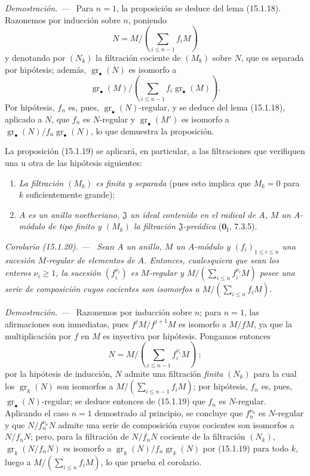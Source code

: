 \documentclass[10pt,oneside]{book}
\makeatletter
\newcommand{\gr}{\operatorname{gr}}
\newcommand{\setmanualcurrentlabel}[1]{\def\@currentlabel{#1}}
\newcommand{\oldpage}[2][]{%
  \setcounter{footnote}{0}%
  \marginpar{\scriptsize\textbf{#1}~|~#2}\ignorespaces}
\newenvironment{corollary}[1][]{%
  \setmanualcurrentlabel{#1}\par\medskip\noindent\itshape Corolario (#1). ---\ }{\par}
\newenvironment{proof}{%
  \par\medskip\noindent\textit{Demostración. ---\ }}{\par}
\makeatother
\begin{document}
\begin{proof}
Para $n=1$, la proposición se deduce del lema (15.1.18). Razonemos por
inducción sobre $n$, poniendo
\[
  N=M/\left(\sum_{i\leq n-1}f_iM\right)
\]
y denotando por $(N_k)$ la filtración cociente de $(M_k)$ sobre $N$, que es
separada por hipótesis; además, $\gr_\bullet(N)$ es isomorfo a
\[
  \gr_\bullet(M)/
  \left(\sum_{i\leq n-1}f_i\gr_\bullet(M)\right).
\]
Por hipótesis, $f_n$ es, pues, $\gr_\bullet(N)$-regular, y se deduce del lema
(15.1.18), aplicado a $N$, que $f_n$ es $N$-regular y $\gr_\bullet(M')$ es
isomorfo a $\gr_\bullet(N)/f_n\gr_\bullet(N)$, lo que demuestra la
proposición.
\end{proof}

La proposición (15.1.19) se aplicará, en particular, a las filtraciones que
verifiquen una u otra de las hipótesis siguientes:
\begin{enumerate}
  \item[$1^\circ$] \emph{La filtración $(M_k)$ es finita y separada} (pues esto
  implica que $M_k=0$ para $k$ suficientemente grande);
  \item[$2^\circ$] \emph{$A$ es un anillo noetheriano, $\mathfrak{J}$ un ideal
  contenido en el radical de $A$, $M$ un $A$-módulo de tipo finito y $(M_k)$
  la filtración $\mathfrak{J}$-preádica} ($\mathbf{0}_{\mathrm I}$, 7.3.5).
\end{enumerate}

\begin{corollary}[15.1.20]
\label{0.15.1.20-es}
\oldpage[0\textsubscript{IV-1}]{20}
Sean $A$ un anillo, $M$ un $A$-módulo y $(f_i)_{1\leq i\leq n}$ una sucesión
$M$-regular de elementos de $A$. Entonces, cualesquiera que sean los enteros
$\nu_i\geq1$, la sucesión $(f_i^{\nu_i})$ es $M$-regular y
$M/(\sum_{i\leq n}f_i^{\nu_i}M)$ posee una serie de composición cuyos
cocientes son isomorfos a $M/(\sum_{i\leq n}f_iM)$.
\end{corollary}

\begin{proof}
Razonemos por inducción sobre $n$; para $n=1$, las afirmaciones son inmediatas,
pues $f^jM/f^{j+1}M$ es isomorfo a $M/fM$, ya que la multiplicación por $f$ en
$M$ es inyectiva por hipótesis. Pongamos entonces
\[
  N=M/\left(\sum_{i\leq n-1}f_i^{\nu_i}M\right)~;
\]
por la hipótesis de inducción, $N$ admite una filtración \emph{finita} $(N_k)$ para la
cual los $\gr_k(N)$ son isomorfos a
$M/(\sum_{i\leq n-1}f_iM)$; por hipótesis, $f_n$ es, pues,
$\gr_\bullet(N)$-regular; se deduce entonces de (15.1.19) que $f_n$ es
$N$-regular. Aplicando el caso $n=1$ demostrado al principio, se concluye que
$f_n^{\nu_n}$ es $N$-regular y que $N/f_n^{\nu_n}N$ admite una serie de
composición cuyos cocientes son isomorfos a $N/f_nN$; pero, para la filtración
de $N/f_nN$ cociente de la filtración $(N_k)$,
$\gr_k(N/f_nN)$ es isomorfo a $\gr_k(N)/f_n\gr_k(N)$ por (15.1.19) para todo
$k$, luego a $M/(\sum_{i\leq n}f_iM)$, lo que prueba el corolario.
\end{proof}
\end{document}

